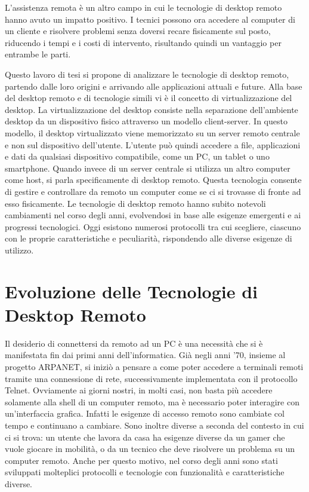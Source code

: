 \documentclass[12pt,a4paper,openright,twoside]{book}
\begin{document}
L'assistenza remota è un altro campo in cui le tecnologie di desktop remoto hanno avuto un impatto positivo.
%
I tecnici possono ora accedere al computer di un cliente e risolvere problemi senza doversi recare fisicamente sul posto,
riducendo i tempi e i costi di intervento,
risultando quindi un vantaggio per entrambe le parti.

Questo lavoro di tesi si propone di analizzare le tecnologie di desktop remoto,
partendo dalle loro origini e arrivando alle applicazioni attuali e future.
%
Alla base del desktop remoto e di tecnologie simili vi è il concetto di virtualizzazione del desktop.
La virtualizzazione del desktop consiste nella separazione dell'ambiente desktop da un dispositivo fisico attraverso un modello client-server.
In questo modello, il desktop virtualizzato viene memorizzato su un server remoto centrale e non sul dispositivo dell'utente.
L'utente può quindi accedere a file,
applicazioni e dati da qualsiasi dispositivo compatibile,
come un \ac{PC},
un tablet o uno smartphone. %
Quando invece di un server centrale si utilizza un altro computer come host,
si parla specificamente di desktop remoto.
Questa tecnologia consente di gestire e controllare da remoto un computer come se ci si trovasse di fronte ad esso fisicamente.
%
Le tecnologie di desktop remoto hanno subito notevoli cambiamenti nel corso degli anni,
evolvendosi in base alle esigenze emergenti e ai progressi tecnologici.
%
Oggi esistono numerosi protocolli tra cui scegliere,
ciascuno con le proprie caratteristiche e peculiarità,
rispondendo alle diverse esigenze di utilizzo.



\chapter{Evoluzione delle Tecnologie di Desktop Remoto}
\label{chap:evolution}
Il desiderio di connettersi da remoto ad un \ac{PC} è una necessità che si è manifestata fin dai primi anni dell'informatica.
Già negli anni '70,
insieme al progetto ARPANET, si iniziò a pensare a come poter accedere a terminali remoti tramite una connessione di rete,
successivamente implementata con il protocollo Telnet.
Ovviamente ai giorni nostri, in molti casi, non basta più accedere solamente alla shell di un computer remoto,
ma è necessario poter interagire con un'interfaccia grafica.
%
Infatti le esigenze di accesso remoto sono cambiate col tempo e continuano a cambiare.
Sono inoltre diverse a seconda del contesto in cui ci si trova:
un utente che lavora da casa ha esigenze diverse da un gamer che vuole giocare in mobilità,
o da un tecnico che deve risolvere un problema su un computer remoto.
Anche per questo motivo, nel corso degli anni sono stati sviluppati molteplici protocolli e tecnologie con funzionalità e caratteristiche diverse.
\end{document}
